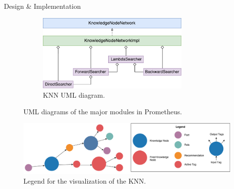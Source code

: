 \documentclass[final]{beamer} %
\begin{document}
\begin{frame}
\begin{columns}
\begin{column}{.34\textwidth}
{\begin{block}{Design \& Implementation}
\begin{figure}
\begin{subfigure}[b]{0.49\textwidth}
						\end{subfigure}
						\begin{subfigure}[b]{0.49\textwidth}
							\centering
							\includegraphics[height=1.5in]{figures/uml_knn.pdf}
							\caption{KNN UML diagram.}
						\end{subfigure}
						\caption{UML diagrams of the major modules in Prometheus.}
					\end{figure}
				
				
					
					\begin{figure}[!htb]
						\centering
						\includegraphics[width=\columnwidth]{figures/knn_graph_legend.pdf}
						\caption
						{Legend for the visualization of the KNN.}
					\end{figure}
					
					

\end{block}}
\end{column}
\end{columns}
\end{frame}
\end{document}
